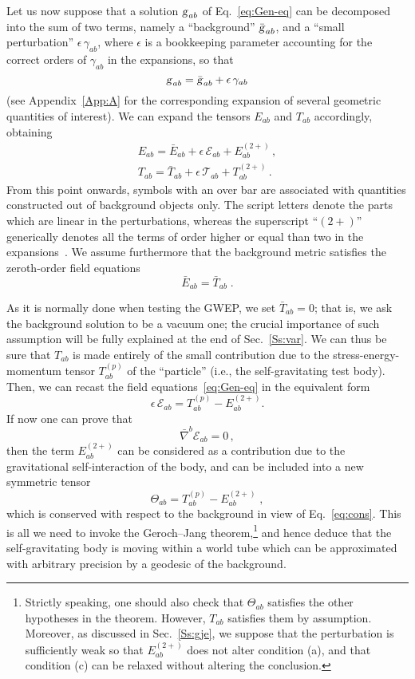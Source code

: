 \documentclass[a4paper,showkeys,aps,prd,reprint,nofootinbib,showpacs,twocolumn]{revtex4-1}
\newcommand{\subeq}[1]{\begin{subequations} #1 \end{subequations}}
\newcommand{\eq}[1]{\( #1 \)}
\newcommand{\eqd}[1]{\begin{equation} #1 \end{equation}}
\newcommand{\gat}[1]{\begin{gather} #1 \end{gather}}
\newcommand{\Cal}[1]{\mathcal{#1}}
\newcommand{\matg}{\text{\textsl{g}}}%
\theoremstyle{plain}
\begin{document}
Let us now suppose that a solution \eq{\matg_{ab}} of Eq.~\eqref{eq:Gen-eq} can be decomposed into the sum of two terms, namely a ``background'' \eq{\bar{\matg}_{ab}}, and a ``small perturbation'' \eq{\epsilon\, \gamma_{ab}}, where \eq{\epsilon} is a bookkeeping  parameter accounting for the correct orders of \eq{\gamma_{ab}} in the expansions, so that
%
\eqd{\matg_{ab} = \bar{\matg}_{ab} + \epsilon \, \gamma_{ab} \label{eq:metricexp}}
%
(see Appendix~\ref{App:A} for the corresponding expansion of several geometric quantities of interest). We can expand the tensors \eq{E_{ab}} and \eq{T_{ab}} accordingly, obtaining
%
\subeq{\gat{E_{ab} = \bar{E}_{ab} + \epsilon \, \Cal{E}_{ab} + E^{(2+)}_{ab} \,, \label{Eexp}\\
T_{ab} = \bar{T}_{ab} + \epsilon \, \Cal{T}_{ab} + T^{(2+)}_{ab} \,. \label{eq:expT}}
\label{eq:expand}}
%
From this point onwards, symbols with an over bar are associated with quantities constructed out of background objects only.  The script letters denote the parts which are linear in the perturbations, whereas the superscript ``\eq{(2+)}'' generically denotes all the terms of order higher or equal than two in the expansions~\cite{Mino}. We assume furthermore that the background metric satisfies the zeroth-order field equations
%
\eqd{\bar{E}_{ab} = \bar{T}_{ab} \;. \label{eq:zerothback}}
% 

As it is normally done when testing the GWEP, we set  \eq{\bar{T}_{ab} = 0}; that is, we ask the background solution to be a vacuum one; the crucial importance of such assumption will be fully explained at the end of Sec.~\ref{Ss:var}.  We can thus be sure that \eq{T_{ab}} is made entirely of the small contribution due to the stress-energy-momentum tensor \eq{T^{(p)}_{ab}} of the ``particle'' (i.e., the self-gravitating test body).  Then, we can recast the field equations~\eqref{eq:Gen-eq} in the equivalent form
%
\eqd{\epsilon \, \Cal{E}_{ab} = T^{(p)}_{ab} - E^{(2+)}_{a b}.
\label{eq:estorto}}
%
If now one can prove that
%
\eqd{\bar{\nabla}^b \Cal{E}_{ab} = 0 \label{eq:cons} \,,}
%
then the term \eq{E^{(2+)}_{a b}} can be considered as a contribution due to  the gravitational self-interaction of the body, and can be included into a new symmetric tensor
%
\eqd{\Theta_{ab} =  T^{(p)}_{ab} - E^{(2+)}_{a b} \;,
\label{eq:Theta}}
%
which is conserved with respect to the background in view of Eq.~\eqref{eq:cons}. This is all we need to invoke the Geroch--Jang theorem,\footnote{Strictly speaking, one should also check  that \eq{\Theta_{ab}} satisfies the other hypotheses in the theorem.  However, \eq{T_{ab}} satisfies them by assumption.  Moreover, as discussed in Sec.~\ref{Ss:gje}, we suppose that the perturbation is sufficiently weak so that \eq{E^{(2+)}_{a b}} does not alter condition (a), and that condition (c) can be relaxed without altering the conclusion.} and  hence deduce that the self-gravitating body is moving within a world tube which can be approximated with arbitrary precision by a geodesic of the background.
\end{document}
